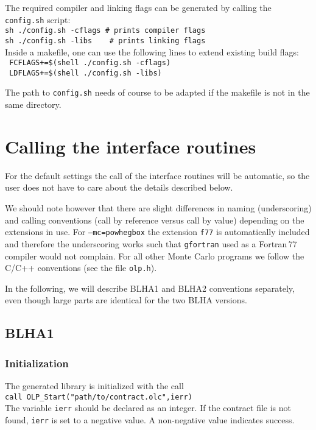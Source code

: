 The required compiler and linking flags can be generated by calling the \texttt{config.sh} script:\\
\texttt{sh ./config.sh -cflags \# prints compiler flags}\\
\texttt{sh ./config.sh -libs \ \ \  \# prints linking flags}\\

Inside a makefile, one can use the following lines to extend existing build flags:\\
\texttt{ FCFLAGS+=\$(shell ./config.sh -cflags)} \\
\texttt{ LDFLAGS+=\$(shell ./config.sh -libs)}

The path to \texttt{config.sh} needs of course to be adapted if the makefile is not in the
same directory.

\section{Calling the interface routines}

For the default settings the call of the interface routines 
will be automatic, so the user does not have to care about the details described below.

We should note however that there are slight differences in naming (underscoring) and calling
conventions (call by reference versus call by value) depending on the
extensions in use. For \texttt{--mc=powhegbox} the extension \texttt{f77}
is automatically included and therefore the underscoring works such that
\texttt{gfortran} used as a Fortran\,77 compiler would not complain.
For all other Monte Carlo programs we follow the C/C++ conventions
(see the file \texttt{olp.h}).

In the following, we will describe BLHA1 and BLHA2 conventions separately, 
even though large parts are identical for the two BLHA versions.

\subsection{BLHA1}

\subsubsection{Initialization}
The generated \gosam{} library is initialized with the call\\
{\tt        call OLP\_Start("path/to/contract.olc",ierr)}\\
The variable \texttt{ierr} should be declared as an integer. If the contract
file is not found, \texttt{ierr} is set to a negative value. A non-negative
value indicates success.

